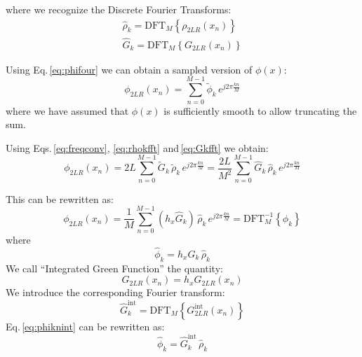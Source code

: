where we recognize the Discrete Fourier Transforms:
\begin{align}
\hat{\rho}_k = \text{DFT}_M\left\{ \rho_{2LR}(x_n)\right\}\\
\hat{G}_k = \text{DFT}_M\left\{ G_{2LR}(x_n)\right\}
\end{align}



Using Eq.\,\eqref{eq:phifour} we can obtain a sampled version of $\phi(x)$:
\begin{equation}
\phi_{2LR}(x_n) = 
\sum_{n=0}^{M-1}  
\tilde{\phi}_k\, e^{j2\pi \frac{kn}{M}}
\label{eq:phifft}
\end{equation}
where we have assumed that $\phi(x)$ is sufficiently smooth to allow truncating the sum.


Using Eqs.\,\eqref{eq:freqconv}, \eqref{eq:rhokfft} and\,\eqref{eq:Gkfft}  we obtain:
\begin{equation}
\phi_{2LR}(x_n) = 
2L \sum_{n=0}^{M-1}  
\tilde{G}_k \, \tilde{\rho}_k\, e^{j2\pi \frac{kn}{M}} 
= 
\frac{2L}{M^2}
\sum_{n=0}^{M-1}  
\hat{G}_k \, \hat{\rho}_k\, e^{j2\pi \frac{kn}{M}} 
\label{eq:phifftsimpl}
\end{equation}

This can be rewritten as:
\begin{equation}
\phi_{2LR}(x_n) = 
\frac{1}{M}
\sum_{n=0}^{M-1}  
(h_x\hat{G}_k) \, \hat{\rho}_k\, e^{j2\pi \frac{kn}{M}} 
=\text{DFT}_M^{-1}\left\{\phi_k
\right\}
\label{eq:invfft}
\end{equation}
where 
\begin{equation}
\hat{\phi}_k =h_x\hat{G}_k \, \hat{\rho}_k
\label{eq:phiknint}
\end{equation}
We call ``Integrated Green Function'' the quantity:
\begin{equation}
G_{2LR}(x_n) = h_x G_{2LR}(x_n)
\end{equation}
We introduce the corresponding Fourier transform:
\begin{equation}
\hat{G}_k^\text{int} = \text{DFT}_M\left\{ G_{2LR}^\text{int}(x_n)\right\}
\end{equation}
Eq.\,\eqref{eq:phiknint} can be rewritten as:
\begin{equation}
\boxed{
\hat{\phi}_k =\hat{G}_k^\text{int} \, \hat{\rho}_k}
\end{equation}

